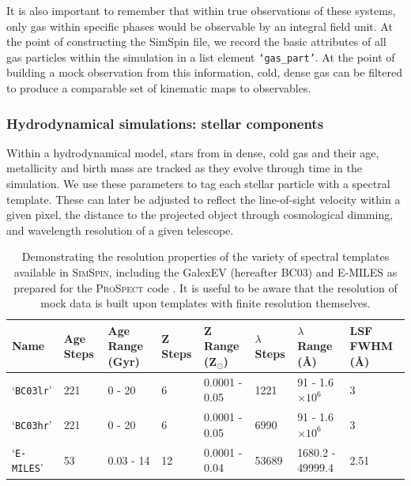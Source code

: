 \documentclass[
  journal=pasa,
  manuscript=research-paper, %
  year=2020,
  volume=37,
]{cup-journal}
\newcommand{\simspin}[1]{\textsc{SimSpin}#1} %
\begin{document}
It is also important to remember that within true observations of these systems, only gas within specific phases would be observable by an integral field unit. At the point of constructing the SimSpin file, we record the basic attributes of all gas particles within the simulation in a list element \texttt{`gas\_part'}. At the point of building a mock observation from this information, cold, dense gas can be filtered to produce a comparable set of kinematic maps to observables.

\subsubsection{Hydrodynamical simulations: stellar components}
\label{sec:stars_ss}

Within a hydrodynamical model, stars from in dense, cold gas and their age, metallicity and birth mass are tracked as they evolve through time in the simulation.
We use these parameters to tag each stellar particle with a spectral template. These can later be adjusted to reflect the line-of-sight velocity within a given pixel, the distance to the projected object through cosmological dimming, and wavelength resolution of a given telescope.

\begin{table}[!ht]
    \centering
   \begin{tabular}{@{}llllllll@{}}
    \toprule
    Name & Age Steps & Age Range (Gyr) & Z Steps & Z Range (Z$_{\odot}$) & $\lambda$ Steps & $\lambda$ Range (\AA) & LSF FWHM (\AA) \\ \midrule
    `\texttt{BC03lr}' & 221 & 0 - 20 & 6 & 0.0001 - 0.05 & 1221 & 91 - 1.6$\times 10^{6}$ & 3 \\
    `\texttt{BC03hr}' & 221 & 0 - 20 & 6 & 0.0001 - 0.05 & 6990 & 91 - 1.6$\times 10^{6}$ & 3 \\
    `\texttt{E-MILES}' & 53 & 0.03 - 14 & 12 & 0.0001 - 0.04 & 53689 & 1680.2 - 49999.4 & 2.51 \\ \bottomrule
    \end{tabular} 
    \caption{Demonstrating the resolution properties of the variety of spectral templates available in \simspin, including the GalexEV \citep{Bruzual2003Stellar2003} (hereafter BC03) and E-MILES \citep{Vazdekis2016UV-extendedGalaxies} as prepared for the \textsc{ProSpect} code \citep{Robotham2020ProSpect:Histories}. It is useful to be aware that the resolution of mock data is built upon templates with finite resolution themselves.}
    \label{tab:templates}
\end{table}
\end{document}
